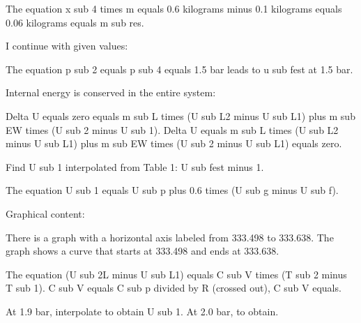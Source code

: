 The equation x sub 4 times m equals 0.6 kilograms minus 0.1 kilograms equals 0.06 kilograms equals m sub res.

I continue with given values:

The equation p sub 2 equals p sub 4 equals 1.5 bar leads to u sub fest at 1.5 bar.

Internal energy is conserved in the entire system:

Delta U equals zero equals m sub L times (U sub L2 minus U sub L1) plus m sub EW times (U sub 2 minus U sub 1).
Delta U equals m sub L times (U sub L2 minus U sub L1) plus m sub EW times (U sub 2 minus U sub L1) equals zero.

Find U sub 1 interpolated from Table 1: U sub fest minus 1.

The equation U sub 1 equals U sub p plus 0.6 times (U sub g minus U sub f).

Graphical content:

There is a graph with a horizontal axis labeled from 333.498 to 333.638. The graph shows a curve that starts at 333.498 and ends at 333.638.

The equation (U sub 2L minus U sub L1) equals C sub V times (T sub 2 minus T sub 1).
C sub V equals C sub p divided by R (crossed out), C sub V equals.

At 1.9 bar, interpolate to obtain U sub 1.
At 2.0 bar, to obtain.